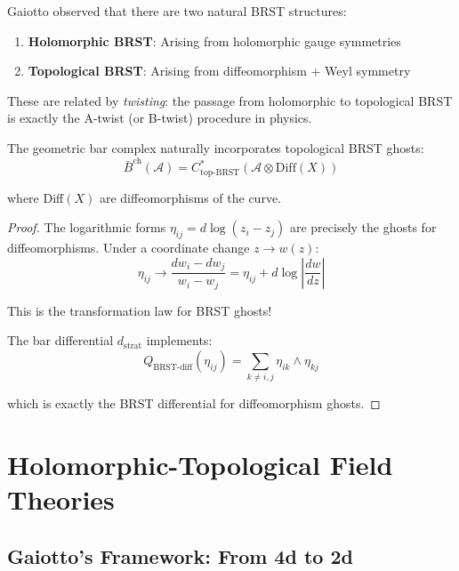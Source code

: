 \begin{remark}
Gaiotto observed that there are two natural BRST structures:
\begin{enumerate}
\item \textbf{Holomorphic BRST}: Arising from holomorphic gauge symmetries
\item \textbf{Topological BRST}: Arising from diffeomorphism + Weyl symmetry
\end{enumerate}

These are related by \emph{twisting}: the passage from holomorphic to 
topological BRST is exactly the A-twist (or B-twist) procedure in physics.
\end{remark}

\begin{theorem}[Bar Complex = Topological BRST]
The geometric bar complex naturally incorporates topological BRST ghosts:
$$\bar{B}^{\text{ch}}(\mathcal{A}) = C^*_{\text{top-BRST}}(\mathcal{A} \otimes 
\text{Diff}(X))$$

where Diff$(X)$ are diffeomorphisms of the curve.
\end{theorem}

\begin{proof}
The logarithmic forms $\eta_{ij} = d\log(z_i - z_j)$ are precisely the ghosts 
for diffeomorphisms. Under a coordinate change $z \to w(z)$:
$$\eta_{ij} \to \frac{dw_i - dw_j}{w_i - w_j} = \eta_{ij} + 
d\log\left|\frac{dw}{dz}\right|$$

This is the transformation law for BRST ghosts!

The bar differential $d_{\text{strat}}$ implements:
$$Q_{\text{BRST-diff}}(\eta_{ij}) = \sum_{k \neq i,j} \eta_{ik} \wedge \eta_{kj}$$

which is exactly the BRST differential for diffeomorphism ghosts.
\end{proof}

\section{Holomorphic-Topological Field Theories}

\subsection{Gaiotto's Framework: From 4d to 2d}

